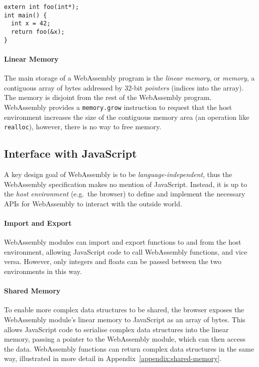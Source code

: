 \vspace*{-1em}

\begin{center}
\begin{verbatim}
extern int foo(int*);
int main() {
  int x = 42;
  return foo(&x);
}
\end{verbatim}
\end{center}

\vspace*{-2em}

\paragraph{Linear Memory}

The main storage of a WebAssembly program is the \emph{linear memory}, or \emph{memory}, a contiguous array of bytes addressed by 32-bit \emph{pointers} (indices into the array). The memory is disjoint from the rest of the WebAssembly program. WebAssembly provides a \texttt{memory.grow} instruction to request that the host environment increases the size of the contiguous memory area (an operation like \texttt{realloc}), however, there is no way to free memory.

\subsection{Interface with JavaScript}

\label{sec:wasm-js-interface}

A key design goal of WebAssembly is to be \emph{language-independent}, thus the WebAssembly specification makes no mention of JavaScript. Instead, it is up to the \emph{host environment} (e.g.\ the browser) to define and implement the necessary APIs for WebAssembly to interact with the outside world.

\paragraph{Import and Export} WebAssembly modules can import and export functions to and from the host environment, allowing JavaScript code to call WebAssembly functions, and vice versa. However, only integers and floats can be passed between the two environments in this way.

\paragraph{Shared Memory} To enable more complex data structures to be shared, the browser exposes the WebAssembly module's linear memory to JavaScript as an array of bytes. This allows JavaScript code to serialise complex data structures into the linear memory, passing a pointer to the WebAssembly module, which can then access the data. WebAssembly functions can return complex data structures in the same way, illustrated in more detail in Appendix~\ref{appendix:shared-memory}.


